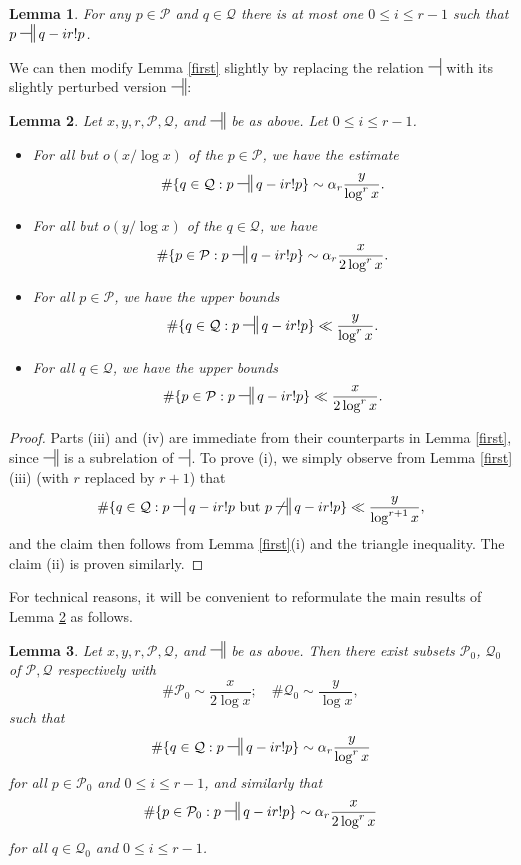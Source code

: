 \documentclass[11pt]{amsart}
\numberwithin{equation}{section}  %
\theoremstyle{remark}
\theoremstyle{plain}
\newtheorem{lem}{Lemma}[section]
\numberwithin{equation}{section}
\renewcommand{\leq}{\leqslant}
\renewcommand{\(}{\left(}
\renewcommand{\)}{\right)}
\newcommand{\asym}{\sim}   %
\newcommand{\rel}{\nsststile{}{}}  %
\newcommand{\relr}{\nsdtstile{}{}} %
\newcommand{\PP}{\mathcal{P}}
\newcommand{\QQ}{\mathcal{Q}}
\begin{document}
\begin{lem}\label{disj} For any $p \in \PP$ and $q \in \QQ$ there is at most one $0 \leq i \leq r-1$ such that $p \relr q - ir!p$.
\end{lem}

We can then modify Lemma \ref{first} slightly by replacing the relation $\rel$ with its slightly perturbed version $\relr$:

\begin{lem}\label{Q0-a}  Let $x,y,r,\PP,\QQ$, and $\relr$ be as above.   Let $0 \leq i \leq r-1$.
\begin{itemize}
\item[(i)] For all but $o(x/\log x)$ of the $p \in \PP$, we have the estimate
\[ \# \{ q \in \QQ: p \relr q-ir!p \} \asym  \alpha_r \frac{y}{\log^r x}.\]
\item[(ii)] For all but $o(y/\log x)$ of the $q \in \QQ$, we have
\[ \# \{ p \in \PP : p \relr q-ir!p \} \asym  \alpha_r  \frac{x}{2\log^r x}.\]
\item[(iii)]  For \emph{all} $p \in \PP$, we have the upper bounds
\[ \# \{ q \in \QQ: p \relr q-ir!p \} \ll \frac{y}{\log^r x}.\]
\item[(iv)]  For \emph{all} $q \in \QQ$, we have the upper bounds
\[ \# \{ p \in \PP : p \relr q-ir!p \} \ll \frac{x}{2\log^r x}.\]
\end{itemize}
\end{lem}

\begin{proof}  Parts (iii) and (iv) are immediate from their counterparts in Lemma \ref{first}, since $\relr$ is a subrelation of $\rel$.  To prove (i), we simply observe from Lemma \ref{first}(iii) (with $r$ replaced by $r+1$) that
\[ \# \{ q \in \QQ: p \rel q-ir!p \hbox{ but } p \not \relr q-ir!p \} \ll \frac{y}{\log^{r+1} x},\]
and the claim then follows from Lemma \ref{first}(i) and the triangle inequality.  The claim (ii) is proven similarly.
\end{proof}

For technical reasons, it will be convenient to reformulate the main results of Lemma \ref{Q0-a} as follows.

\begin{lem}\label{Q0}  Let $x,y,r,\PP,\QQ$, and $\relr$ be as above.   Then there exist subsets $\PP_0$, $\QQ_0$ of $\PP, \QQ$ respectively with
\begin{equation}\label{pq0}
\# \PP_0 \asym \frac{x}{2\log x}; \quad \# \QQ_0 \asym \frac{y}{\log x},
\end{equation}
such that
\begin{equation}\label{q0-i}
 \# \{ q \in \QQ: p \relr q-ir!p \} \asym  \alpha_r \frac{y}{\log^r x}
\end{equation}
for \emph{all} $p \in \PP_0$ and $0 \leq i \leq r-1$, and similarly that
\begin{equation}\label{q0-ii}
 \# \{ p \in \PP_0 : p \relr q-ir!p \} \asym  \alpha_r  \frac{x}{2\log^r x}
\end{equation}
for \emph{all} $q \in \QQ_0$ and $0 \leq i \leq r-1$.
\end{lem}
\end{document}
